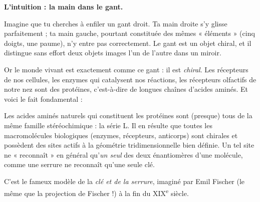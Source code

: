 \documentclass[11pt]{article}
\newcommand{\cle}[1]{{\popxbold\color{popdark}#1}}
\begin{document}
\textbf{L'intuition : la main dans le gant.}\par
Imagine que tu cherches à enfiler un gant droit. Ta main droite s'y glisse parfaitement ; ta main gauche, pourtant constituée des mêmes « éléments » (cinq doigts, une paume), n'y entre pas correctement. Le gant est un objet \cle{chiral}, et il distingue sans effort deux objets images l'un de l'autre dans un miroir.

Or le monde vivant est exactement comme ce gant : il est \emph{chiral}. Les récepteurs de nos cellules, les enzymes qui catalysent nos réactions, les récepteurs olfactifs de notre nez sont des protéines, c'est-à-dire de longues chaînes d'\cle{acides aminés}. Et voici le fait fondamental :

\begin{propriete}
Les acides aminés naturels qui constituent les protéines sont (presque) tous de la même famille stéréochimique : la \cle{série L}. Il en résulte que toutes les macromolécules biologiques (enzymes, récepteurs, anticorps) sont chirales et possèdent des sites actifs à la géométrie tridimensionnelle bien définie. Un tel site ne « reconnaît » en général qu'\emph{un seul} des deux énantiomères d'une molécule, comme une serrure ne reconnaît qu'une seule clé.
\end{propriete}

C'est le fameux modèle de la \emph{clé et de la serrure}, imaginé par Emil Fischer (le même que la projection de Fischer !) à la fin du XIX\textsuperscript{e} siècle.
\end{document}
